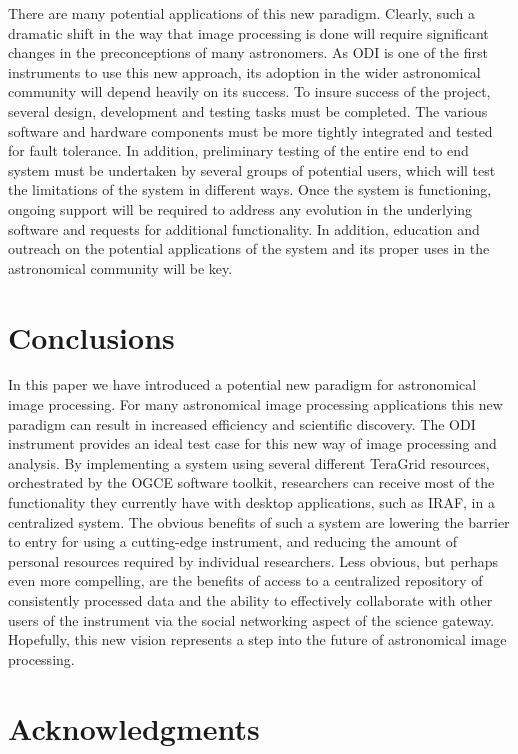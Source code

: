 \documentclass[10pt,conference]{IEEEtran}
\begin{document}
There are many potential applications of this new paradigm. Clearly, such a dramatic shift in the way that image processing is done will require significant changes in the preconceptions of many astronomers. As ODI is one of the first instruments to use this new approach, its adoption in the wider astronomical community will depend heavily on its success. To insure success of the project, several design, development and testing tasks must be completed. The various software and hardware components must be more tightly integrated and tested for fault tolerance. In addition, preliminary testing of the entire end to end system must be undertaken by several groups of potential users, which will test the limitations of the system in different ways. Once the system is functioning, ongoing support will be required to address any evolution in the underlying software and requests for additional functionality. In addition, education and outreach on the potential applications of the system and its proper uses in the astronomical community will be key. 

\section{Conclusions}\label{sec:conclusions}

In this paper we have introduced a potential new paradigm for astronomical image processing. For many astronomical image processing applications this new paradigm can result in increased efficiency and scientific discovery. The ODI instrument provides an ideal test case for this new way of image processing and analysis. By implementing a system using several different TeraGrid resources, orchestrated by the OGCE software toolkit, researchers can receive most of the functionality they currently have with desktop applications, such as IRAF, in a centralized system. The obvious benefits of such a system are lowering the barrier to entry for using a cutting-edge instrument, and reducing the amount of personal resources required by individual researchers. Less obvious, but perhaps even more compelling, are the benefits of access to a centralized repository of consistently processed data and the ability to effectively collaborate with other users of the instrument via the social networking aspect of the science gateway. Hopefully, this new vision represents a step into the future of astronomical image processing. 

\section*{Acknowledgments}
\end{document}
